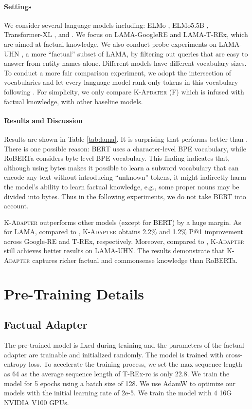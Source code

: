 \documentclass[11pt,a4paper]{article}
\begin{document}
\paragraph{Settings}
We consider several language models including: ELMo \citep{peters2018elmo}, ELMo5.5B \citep{peters2018elmo}, Transformer-XL \citep{dai2019transformer},  and . We focus on LAMA-GoogleRE and LAMA-T-REx, which are aimed at factual knowledge. We also conduct probe experiments on LAMA-UHN \citep{poerner2019bert}, a more “factual” subset of LAMA, by filtering out queries that are easy to answer from entity names alone. Different models have different vocabulary sizes. To conduct a more fair comparison experiment, we adopt the intersection of vocabularies and let every language model rank only tokens in this vocabulary following \citet{petroni2019language}. For simplicity, we only compare \textsc{K-Apdater} (F) which is infused with factual knowledge, with other baseline models.
\paragraph{Results and Discussion}
Results are shown in Table \ref{tab:lama}. It is surprising that  performs better than . There is one possible reason: BERT uses a character-level BPE \citep{gage1994new} vocabulary, while RoBERTa considers byte-level BPE vocabulary. This finding indicates that, although using bytes makes it possible to learn a subword vocabulary that can encode any text without introducing ``unknown'' tokens, it might indirectly harm the model's ability to learn factual knowledge, e.g., some proper nouns may be divided into bytes. 
Thus in the following experiments, we do not take BERT into account.

\textsc{K-Adapter} outperforms other models (except for BERT) by a huge margin. As for LAMA, compared to , \textsc{K-Adapter} obtains 2.2\% and 1.2\% P@1 improvement across Google-RE and T-REx, respectively. Moreover, compared to , \textsc{K-Adapter} still achieves better results on LAMA-UHN. The results demonstrate that \textsc{K-Adapter} captures richer factual and commonsense knowledge than RoBERTa.


\section{Pre-Training Details}
\subsection{Factual Adapter}
The pre-trained model is fixed during training and the parameters of the factual adapter are trainable and initialized randomly. The model is trained with cross-entropy loss. To accelerate the training process, we set the max sequence length as 64 as the average sequence length of T-REx-rc is only 22.8. We train the model for 5 epochs using a batch size of 128. We use AdamW to optimize our models with the initial learning rate of 2e-5. We train the model with 4 16G NVIDIA V100 GPUs.
\end{document}
